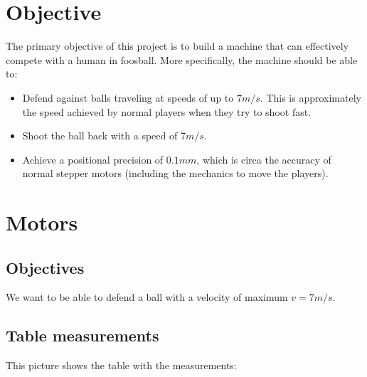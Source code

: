 \section{Objective}\label{sec:objective}

The primary objective of this project is to build a machine that can effectively compete with a human in foosball.
More specifically, the machine should be able to:

\begin{itemize}
    \item Defend against balls traveling at speeds of up to $7m/s$.
    This is approximately the speed achieved by normal players when they try to shoot fast.
    \item Shoot the ball back with a speed of $7m/s$.
    \item Achieve a positional precision of $0.1mm$, which is circa the accuracy of normal stepper motors (including the mechanics to move the players).
\end{itemize}


\section{Motors}\label{sec:motors}

\subsection{Objectives}\label{subsec:objectives}
We want to be able to defend a ball with a velocity of maximum $v=7m/s$.

\subsection{Table measurements}\label{subsec:table_measurements}
This picture shows the table with the measurements:

